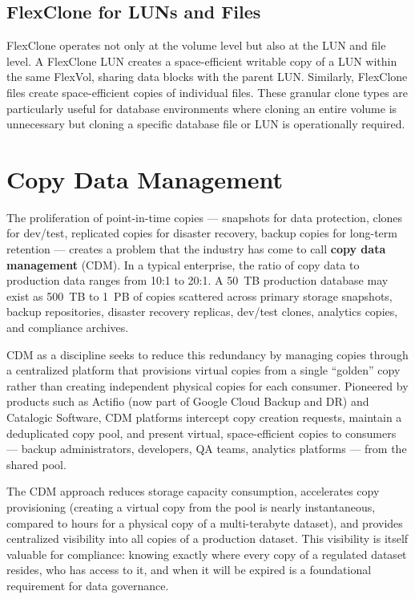 \subsection{FlexClone for LUNs and Files}

FlexClone operates not only at the volume level but also at the LUN and file level. A FlexClone LUN creates a space-efficient writable copy of a LUN within the same FlexVol, sharing data blocks with the parent LUN. Similarly, FlexClone files create space-efficient copies of individual files. These granular clone types are particularly useful for database environments where cloning an entire volume is unnecessary but cloning a specific database file or LUN is operationally required.

\section{Copy Data Management}

The proliferation of point-in-time copies --- snapshots for data protection, clones for dev/test, replicated copies for disaster recovery, backup copies for long-term retention --- creates a problem that the industry has come to call \textbf{copy data management} (CDM). In a typical enterprise, the ratio of copy data to production data ranges from 10:1 to 20:1. A 50~TB production database may exist as 500~TB to 1~PB of copies scattered across primary storage snapshots, backup repositories, disaster recovery replicas, dev/test clones, analytics copies, and compliance archives.

CDM as a discipline seeks to reduce this redundancy by managing copies through a centralized platform that provisions virtual copies from a single ``golden'' copy rather than creating independent physical copies for each consumer. Pioneered by products such as Actifio (now part of Google Cloud Backup and DR) and Catalogic Software, CDM platforms intercept copy creation requests, maintain a deduplicated copy pool, and present virtual, space-efficient copies to consumers --- backup administrators, developers, QA teams, analytics platforms --- from the shared pool.

The CDM approach reduces storage capacity consumption, accelerates copy provisioning (creating a virtual copy from the pool is nearly instantaneous, compared to hours for a physical copy of a multi-terabyte dataset), and provides centralized visibility into all copies of a production dataset. This visibility is itself valuable for compliance: knowing exactly where every copy of a regulated dataset resides, who has access to it, and when it will be expired is a foundational requirement for data governance.

